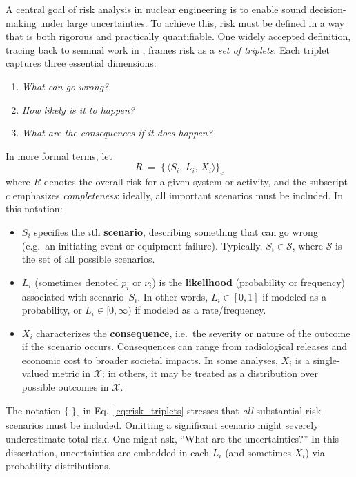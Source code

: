 A central goal of risk analysis in nuclear engineering is to enable sound decision-making under large uncertainties. To achieve this, risk must be defined in a way that is both rigorous and practically quantifiable. One widely accepted definition, tracing back to seminal work in \cite{kaplan_quantitative_1981, garrick_quantifying_2008}, frames risk as a \emph{set of triplets}. Each triplet captures three essential dimensions:

\begin{enumerate}
  \item \textit{What can go wrong?}
  \item \textit{How likely is it to happen?}
  \item \textit{What are the consequences if it does happen?}
\end{enumerate}

In more formal terms, let
\begin{equation}
\label{eq:risk_triplets}
    R \;=\;
    \bigl\{\,
        \langle
            S_i,\,
            L_i,\,
            X_i
        \rangle
    \bigr\}_{c}
\end{equation}
where \(R\) denotes the overall risk for a given system or activity, and the subscript \(c\) emphasizes \emph{completeness}: ideally, all important scenarios must be included. In this notation:
\begin{itemize}
    \item \(S_i\) specifies the \(i\)th \textbf{scenario}, describing something that can go wrong (e.g.\ an initiating event or equipment failure).  Typically, \(S_i \in \mathcal{S}\), where \(\mathcal{S}\) is the set of all possible scenarios.
    \item \(L_i\) (sometimes denoted \(p_i\) or \(\nu_i\)) is the \textbf{likelihood} (probability or frequency) associated with scenario~\(S_i\).  In other words, \(L_i\in [0,1]\) if modeled as a probability, or \(L_i\in [0,\infty)\) if modeled as a rate/frequency.
    \item \(X_i\) characterizes the \textbf{consequence}, i.e.\ the severity or nature of the outcome if the scenario occurs. Consequences can range from radiological releases and economic cost to broader societal impacts. In some analyses, \(X_i\) is a single-valued metric in \(\mathcal{X}\); in others, it may be treated as a distribution over possible outcomes in \(\mathcal{X}\).
\end{itemize}

The notation \(\{\cdot\}_{c}\) in Eq.~\eqref{eq:risk_triplets} stresses that \emph{all} substantial risk scenarios must be included. Omitting a significant scenario might severely underestimate total risk. One might ask, ``What are the uncertainties?'' In this dissertation, uncertainties are embedded in each \(L_i\) (and sometimes \(X_i\)) via probability distributions.

